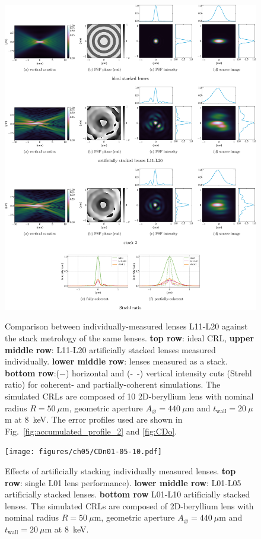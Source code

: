 \begin{refsection}
\begin{figure}[ht]
        \centering
        {\includegraphics[width=1\linewidth]{figures/ch05/CDo_vs_CDoStack.pdf}}
        \caption[Artificially stacked lenses L11-L21 vs. stack 2 comparison]{Comparison between individually-measured lenses L11-L20 against the stack metrology of the same lenses. \textbf{top row}: ideal CRL, \textbf{upper middle row}: L11-L20 artificially stacked lenses measured individually. \textbf{lower middle row}: lenses measured as a stack. \textbf{bottom row}:($-$) horizontal and (-~-) vertical intensity cuts (Strehl ratio) for coherent- and partially-coherent simulations. The simulated CRLs are composed of 10 2D-beryllium lens with nominal radius $R=50~\mu\text{m}$, geometric aperture $A_{\diameter}=440~\mu\text{m}$ and $t_\text{wall}=20~\mu$m at 8~keV. The error profiles used are shown in Fig.~\ref{fig:accumulated_profile_2} and \ref{fig:CDo}.}\label{fig:CDo_vs_CDoStack}
\end{figure}

\begin{figure}[ht]
        \centering
        {\texttt{[image: figures/ch05/CDn01-05-10.pdf]}}
        \caption[Effects of stacking lenses]{Effects of artificially stacking individually measured lenses. \textbf{top row}: single L01 lens performance). \textbf{lower middle row}: L01-L05 artificially stacked lenses. \textbf{bottom row} L01-L10 artificially stacked lenses. The simulated CRLs are composed of 2D-beryllium lens with nominal radius $R=50~\mu\text{m}$, geometric aperture $A_{\diameter}=440~\mu\text{m}$ and $t_\text{wall}=20~\mu$m at 8~keV.}\label{fig:CDn01-05-10}
\end{figure}


\end{refsection}
